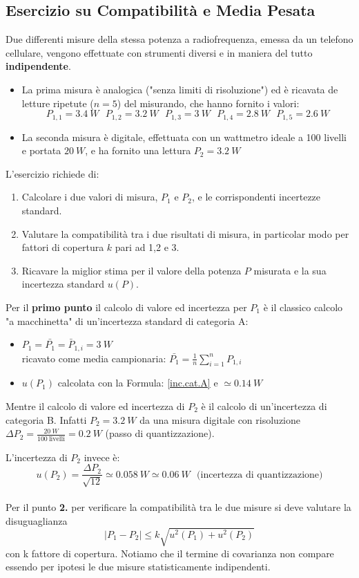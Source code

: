 \documentclass[a4paper,11pt]{report}
\begin{document}
\subsection{Esercizio su Compatibilità e Media Pesata}
Due differenti misure della stessa potenza a radiofrequenza, emessa da un telefono cellulare, vengono effettuate con strumenti diversi e in maniera del tutto \textbf{indipendente}.
\begin{itemize}
  \item La prima misura è analogica ("senza limiti di risoluzione") ed è ricavata de letture ripetute ($n=5$) del misurando, che hanno fornito i valori:
  $$
    P_{1,1} = 3.4~W~~~P_{1,2} = 3.2~W~~~P_{1,3} = 3~W~~~P_{1,4} = 2.8~W~~~P_{1,5} = 2.6~W 
  $$
  \item La seconda misura è digitale, effettuata con un wattmetro ideale a 100 livelli e portata $20~W$, e ha fornito una lettura $P_2 = 3.2~W$
\end{itemize}
L'esercizio richiede di:
\begin{enumerate}
  \item Calcolare i due valori di misura, $P_1$ e $P_2$, e le corrispondenti incertezze standard.
  \item Valutare la compatibilità tra i due risultati di misura, in particolar modo per fattori di copertura $k$ pari ad 1,2 e 3.
  \item Ricavare la miglior stima per il valore della potenza $P$ misurata e la sua incertezza standard $u(P)$.
\end{enumerate}
Per il \textbf{primo punto} il calcolo di valore ed incertezza per $P_1$ è il classico calcolo "a macchinetta" di un'incertezza standard di categoria A: 
\begin{itemize}
  \item $P_1 = \bar{P_1} = \bar{P}_{1,i} = 3~W$\\ricavato come media campionaria: $\bar{P_1} = \frac{1}{n}\sum^n_{i=1}P_{1,i}$
  \item $u(P_1)$ calcolata con la Formula: \ref{inc.cat.A} e $\simeq0.14~W$
\end{itemize}
Mentre il calcolo di valore ed incertezza di $P_2$ è il calcolo di un'incertezza di categoria B. Infatti $P_2 = 3.2~W$ da una misura digitale con risoluzione $\Delta P_2 = \frac{20~W}{100~\text{livelli}} = 0.2~W$ (passo di quantizzazione).

L'incertezza di $P_2$ invece è:
$$
  u(P_2) = \frac{\Delta P_2}{\sqrt{12}} \simeq 0.058~W \simeq 0.06~W\text{~~(incertezza di quantizzazione)}
$$
\\
Per il punto \textbf{2.} per verificare la compatibilità tra le due misure si deve valutare la disuguaglianza
$$
  |P_1 - P_2| \le k \sqrt{u^2(P_1)+u^2(P_2)}
$$
con k fattore di copertura. Notiamo che il termine di covarianza non compare essendo per ipotesi le due misure statisticamente indipendenti.
\end{document}

